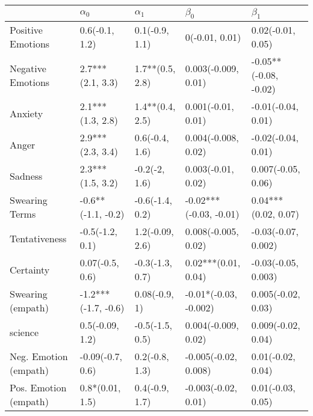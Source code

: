 \begin{tabular}{lllll}
\toprule
{} &           $\alpha_0$ &       $\alpha_1$ &               $\beta_0$ &              $\beta_1$ \\
\midrule
Positive Emotions     &       0.6(-0.1, 1.2) &   0.1(-0.9, 1.1) &          0(-0.01, 0.01) &      0.02(-0.01, 0.05) \\
Negative Emotions     &     2.7***(2.1, 3.3) &  1.7**(0.5, 2.8) &     0.003(-0.009, 0.01) &  -0.05**(-0.08, -0.02) \\
Anxiety               &     2.1***(1.3, 2.8) &  1.4**(0.4, 2.5) &      0.001(-0.01, 0.01) &     -0.01(-0.04, 0.01) \\
Anger                 &     2.9***(2.3, 3.4) &   0.6(-0.4, 1.6) &     0.004(-0.008, 0.02) &     -0.02(-0.04, 0.01) \\
Sadness               &     2.3***(1.5, 3.2) &    -0.2(-2, 1.6) &      0.003(-0.01, 0.02) &     0.007(-0.05, 0.06) \\
Swearing Terms        &   -0.6**(-1.1, -0.2) &  -0.6(-1.4, 0.2) &  -0.02***(-0.03, -0.01) &    0.04***(0.02, 0.07) \\
Tentativeness         &      -0.5(-1.2, 0.1) &  1.2(-0.09, 2.6) &     0.008(-0.005, 0.02) &    -0.03(-0.07, 0.002) \\
Certainty             &      0.07(-0.5, 0.6) &  -0.3(-1.3, 0.7) &     0.02***(0.01, 0.04) &    -0.03(-0.05, 0.003) \\
Swearing (empath)     &  -1.2***(-1.7, -0.6) &    0.08(-0.9, 1) &   -0.01*(-0.03, -0.002) &     0.005(-0.02, 0.03) \\
science               &      0.5(-0.09, 1.2) &  -0.5(-1.5, 0.5) &     0.004(-0.009, 0.02) &     0.009(-0.02, 0.04) \\
Neg. Emotion (empath) &     -0.09(-0.7, 0.6) &   0.2(-0.8, 1.3) &    -0.005(-0.02, 0.008) &      0.01(-0.02, 0.04) \\
Pos. Emotion (empath) &      0.8*(0.01, 1.5) &   0.4(-0.9, 1.7) &     -0.003(-0.02, 0.01) &      0.01(-0.03, 0.05) \\
\bottomrule
\end{tabular}
